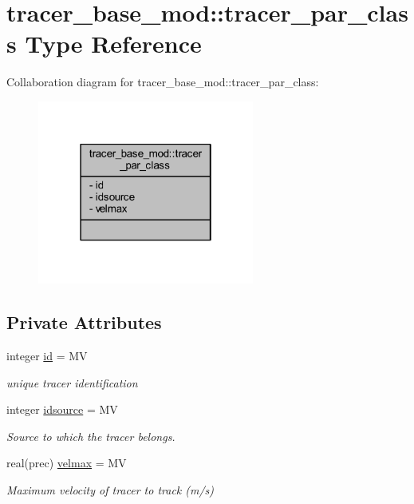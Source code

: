 \hypertarget{structtracer__base__mod_1_1tracer__par__class}{}\section{tracer\+\_\+base\+\_\+mod\+:\+:tracer\+\_\+par\+\_\+class Type Reference}
\label{structtracer__base__mod_1_1tracer__par__class}


Collaboration diagram for tracer\+\_\+base\+\_\+mod\+:\+:tracer\+\_\+par\+\_\+class\+:\nopagebreak
\begin{figure}[H]
\begin{center}
\leavevmode
\includegraphics[width=202pt]{structtracer__base__mod_1_1tracer__par__class__coll__graph}
\end{center}
\end{figure}
\subsection*{Private Attributes}
\begin{DoxyCompactItemize}
\item 
integer \mbox{\hyperlink{structtracer__base__mod_1_1tracer__par__class_a659d37298b1c0a06c7627e33085eaf77}{id}} = MV
\begin{DoxyCompactList}\small\item\em unique tracer identification \end{DoxyCompactList}\item 
integer \mbox{\hyperlink{structtracer__base__mod_1_1tracer__par__class_ad8fa9b92761b2a1f833d77c48adbb2b3}{idsource}} = MV
\begin{DoxyCompactList}\small\item\em Source to which the tracer belongs. \end{DoxyCompactList}\item 
real(prec) \mbox{\hyperlink{structtracer__base__mod_1_1tracer__par__class_a58ad740d66f1c65d200ad7bd22fbcb77}{velmax}} = MV
\begin{DoxyCompactList}\small\item\em Maximum velocity of tracer to track (m/s) \end{DoxyCompactList}\end{DoxyCompactItemize}


